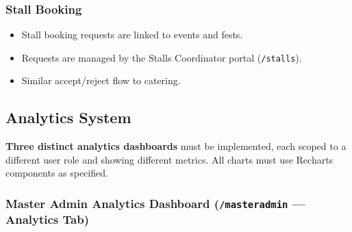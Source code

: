 \documentclass[12pt,a4paper]{article}
\begin{document}
\subsubsection{Stall Booking}

\begin{itemize}[leftmargin=*]
    \item Stall booking requests are linked to events and fests.
    \item Requests are managed by the Stalls Coordinator portal (\texttt{/stalls}).
    \item Similar accept/reject flow to catering.
\end{itemize}

\subsection{Analytics System}

\begin{reqbox}
\textbf{Three distinct analytics dashboards} must be implemented, each scoped to a different user role and showing different metrics. All charts must use Recharts components as specified.
\end{reqbox}

\vspace{0.4cm}

\subsubsection{Master Admin Analytics Dashboard (\texttt{/masteradmin} — Analytics Tab)}
\end{document}
